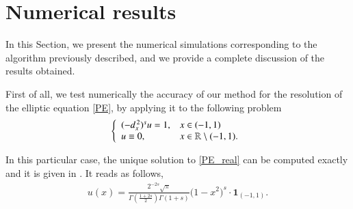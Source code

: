 \section{Numerical results} \label{res_numerical}
In this Section, we present the numerical simulations corresponding to the algorithm previously described, and we provide a complete discussion of the results obtained. 

First of all, we test numerically the accuracy of our method for the resolution of the elliptic equation \eqref{PE}, by applying it to the following problem 
\begin{align}\label{PE_real}
	\left\{\begin{array}{ll}
		(-d_x^{\,2})^{s}u = 1, & x\in(-1,1)
		\\
		u\equiv 0, & x\in\mathbb{R}\setminus(-1,1).
	\end{array}\right.
\end{align}

In this particular case, the unique solution to \eqref{PE_real} can be computed exactly and it is given in \cite{getoor1961first}. It reads as follows, 
\begin{align}\label{real_sol}
	u(x)=\frac{2^{-2s}\sqrt{\pi}}{\Gamma\left(\frac{1+2s}{2}\right)\Gamma(1+s)}\Big(1-x^2\Big)^s\cdot\mathbf{1}_{(-1,1)}.
\end{align}

